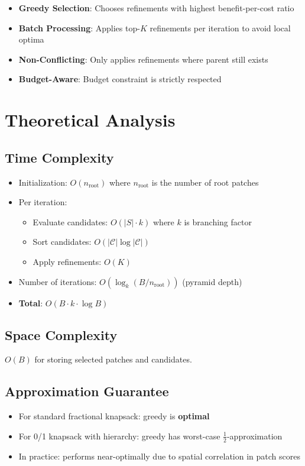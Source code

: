 \documentclass[11pt]{article}
\begin{document}
\begin{itemize}
    \item \textbf{Greedy Selection}: Chooses refinements with highest benefit-per-cost ratio
    \item \textbf{Batch Processing}: Applies top-$K$ refinements per iteration to avoid local optima
    \item \textbf{Non-Conflicting}: Only applies refinements where parent still exists
    \item \textbf{Budget-Aware}: Budget constraint is strictly respected
\end{itemize}

\section{Theoretical Analysis}

\subsection{Time Complexity}
\begin{itemize}[nosep]
    \item Initialization: $O(n_{\text{root}})$ where $n_{\text{root}}$ is the number of root patches
    \item Per iteration:
    \begin{itemize}[nosep]
        \item Evaluate candidates: $O(|S| \cdot k)$ where $k$ is branching factor
        \item Sort candidates: $O(|\mathcal{C}| \log |\mathcal{C}|)$
        \item Apply refinements: $O(K)$
    \end{itemize}
    \item Number of iterations: $O(\log_{k}(B / n_{\text{root}}))$ (pyramid depth)
    \item \textbf{Total}: $O(B \cdot k \cdot \log B)$
\end{itemize}

\subsection{Space Complexity}
$O(B)$ for storing selected patches and candidates.

\subsection{Approximation Guarantee}
\begin{itemize}[nosep]
    \item For standard fractional knapsack: greedy is \textbf{optimal}
    \item For 0/1 knapsack with hierarchy: greedy has worst-case $\frac{1}{2}$-approximation
    \item In practice: performs near-optimally due to spatial correlation in patch scores
\end{itemize}
\end{document}
